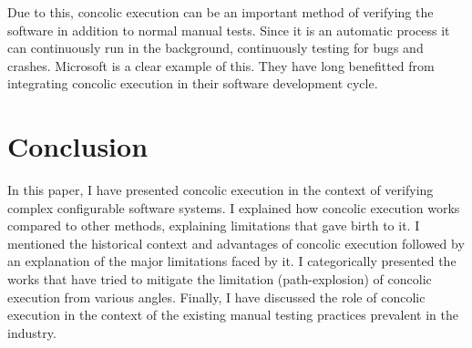 \documentclass[ runningheads,
               a4paper]{llncs}
\begin{document}
Due to this, concolic execution can be an important method \cite{fsct2019, csallner2008dysy, christakis2016guiding} of verifying the software in addition to normal manual tests. Since it is an automatic process it can continuously run in the background, continuously testing for bugs and crashes. Microsoft is a clear example of this. They have long benefitted \cite{godefroid2008automated, godefroid2012sage, bounimova2013billions} from integrating concolic execution in their software development cycle.




\section{Conclusion}
In this paper, I have presented concolic execution in the context of verifying complex configurable software systems. I explained how concolic execution works compared to other methods, explaining limitations that gave birth to it. I mentioned the historical context and advantages of concolic execution followed by an explanation of the major limitations faced by it. I categorically presented the works that have tried to mitigate the limitation (path-explosion) of concolic execution from various angles. Finally, I have discussed the role of concolic execution in the context of the existing manual testing practices prevalent in the industry.











  
\end{document}
